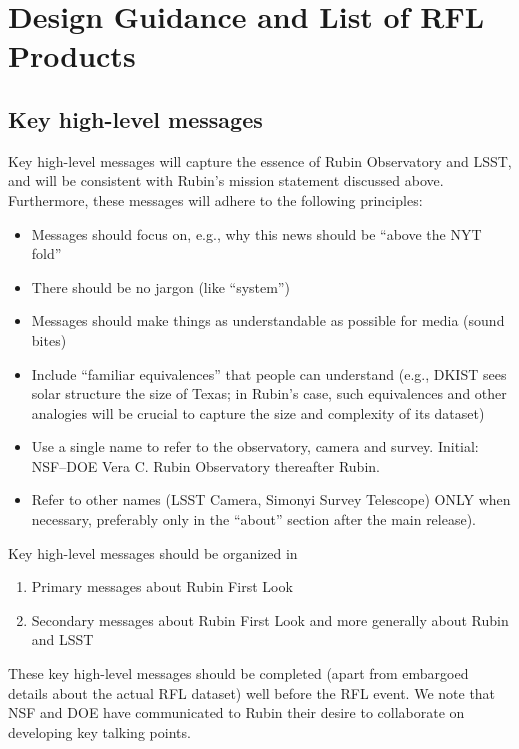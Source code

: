 \section{Design Guidance and List of RFL Products \label{RFLproducts}}

\subsection{Key high-level messages \label{khlm}}

Key high-level messages will capture the essence of Rubin Observatory and LSST, and will be
consistent with Rubin's mission statement discussed above. Furthermore, these messages
will adhere to the following principles:
\begin{itemize}
\item Messages should focus on, e.g., why this news should be ``above the NYT fold''
\item There should be no jargon (like ``system'')
\item Messages should make things as understandable as possible for media (sound bites)
\item Include ``familiar equivalences'' that people can understand (e.g., DKIST sees solar structure the size of Texas;
     in Rubin's case, such equivalences and other analogies will be crucial to capture the size and complexity of its dataset) 
\item Use a single name to refer to the observatory, camera and survey. Initial: NSF–DOE Vera C. Rubin Observatory thereafter Rubin. 
\item Refer to other names (LSST Camera, Simonyi Survey Telescope) ONLY when necessary, preferably only in the ``about'' section after the main release).
\end{itemize}

Key high-level messages should be organized in
\begin{enumerate}
\item Primary messages about Rubin First Look
\item Secondary messages about Rubin First Look and more generally about Rubin and LSST
\end{enumerate}

These key high-level messages should be completed (apart from embargoed details about
the actual RFL dataset) well before the RFL event. We note that NSF and DOE have communicated
to Rubin their desire to collaborate on developing key talking points.
 

